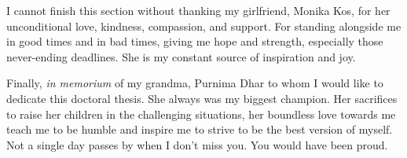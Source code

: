 I cannot finish this section without thanking my girlfriend, Monika Kos, for her unconditional love, kindness, compassion, and support. For standing alongside me in good times and in bad times, giving me hope and strength, especially those never-ending deadlines. She is my constant source of inspiration and joy.

\vspace{1cm}
Finally, \emph{in memorium} of my grandma, Purnima Dhar to whom I would like to dedicate this doctoral thesis. She always was my biggest champion. Her sacrifices to raise her children in the challenging  situations, her boundless love towards me teach me to be humble and inspire me to strive to be the best version of myself. Not a single day passes by when I don't miss you. You would have been proud.


\endgroup
